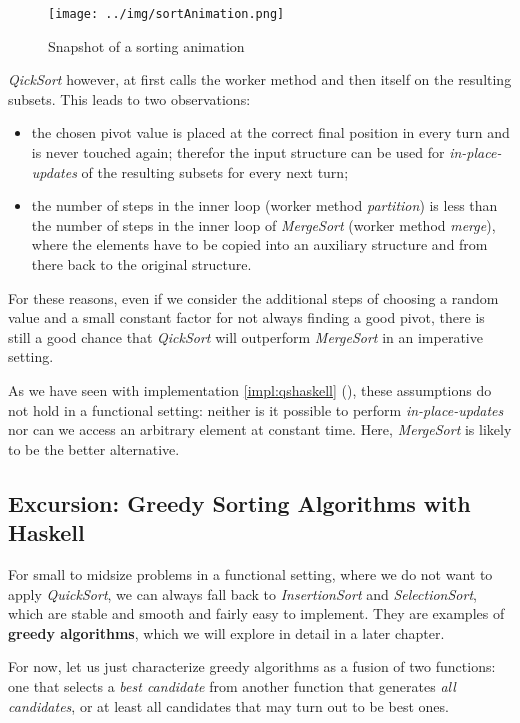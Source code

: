 \begin{figure}[ht]
\centering
\texttt{[image: ../img/sortAnimation.png]}
\caption[Sorting in Action]{Snapshot of a sorting animation}
\end{figure}

\emph{QickSort} however, at first calls the worker method and then itself on the resulting subsets.
This leads to two observations:
\begin{itemize}
    \item the chosen pivot value is placed at the correct final position in every turn and is never touched again; therefor the input structure can be used for \emph{in-place-updates} of the resulting subsets for every next turn;
    \item the number of steps in the inner loop (worker method \emph{partition}) is less than the number of steps in the inner loop of \emph{MergeSort} (worker method \emph{merge}), where the elements have to be copied into an auxiliary structure and from there back to the original structure.
\end{itemize}

For these reasons, even if we consider the additional steps of choosing a random value and a small constant factor for not always finding a good pivot, there is still a good chance that \emph{QickSort} will outperform \emph{MergeSort} in an imperative setting.

As we have seen with implementation \ref{impl:qshaskell} (), these assumptions do not hold in a functional setting: neither is it possible to perform \emph{in-place-updates} nor can we access an arbitrary element at constant time.
Here, \emph{MergeSort} is likely to be the better alternative. 

\subsection{Excursion: Greedy Sorting Algorithms with Haskell}

For small to midsize problems in a functional setting, where we do not want to apply \emph{QuickSort}, we can always fall back to \emph{InsertionSort} and \emph{SelectionSort}, which are stable and smooth and fairly easy to implement.
They are examples of \textbf{greedy algorithms}, which we will explore in detail in a later chapter.

For now, let us just characterize greedy algorithms as a fusion of two functions: one that selects a \emph{best candidate} from another function that generates \emph{all candidates}, or at least all candidates that may turn out to be best ones.

